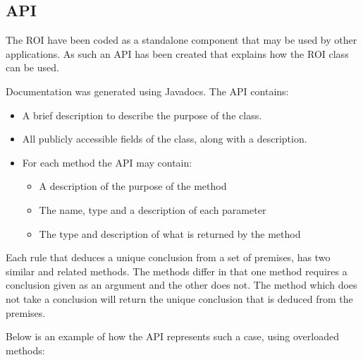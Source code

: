 \subsection{API} 

The ROI have been coded as a standalone component that may be used by other applications. As such an API has been created that explains how the ROI class can be used. 

Documentation was generated using Javadocs. 
The API contains:
\begin{itemize}
\item{A brief description to describe the purpose of the class.}
\item{All publicly accessible fields of the class, along with a description.}
\item{For each method the API may contain:}
\begin{itemize}
\item{A description of the purpose of the method}
\item{The name, type and a description of each parameter}
\item{The type and description of  what is returned by the method}
\end{itemize}
\end{itemize}

Each rule that deduces a unique conclusion from a set of premises, has two similar and related methods. The methods differ in that one method requires a conclusion given as an argument  and the other does not. The method which does not take a conclusion will return the unique conclusion that is deduced from the premises. 

Below is an example of how the API represents such a case, using overloaded methods: 



